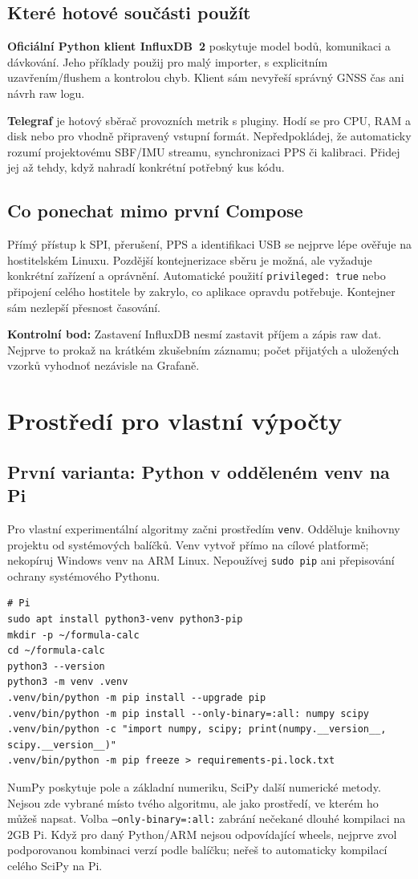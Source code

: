 \documentclass[11pt,a4paper]{article}
\newcommand{\kontrola}[1]{\par\noindent\textbf{Kontrolní bod:} #1\par}
\begin{document}
\subsection{Které hotové součásti použít}
\textbf{Oficiální Python klient InfluxDB~2} poskytuje model bodů, komunikaci a dávkování. Jeho příklady použij pro malý importer, s explicitním uzavřením/flushem a kontrolou chyb. Klient sám nevyřeší správný GNSS čas ani návrh raw logu.\cite{python-client}

\textbf{Telegraf} je hotový sběrač provozních metrik s pluginy. Hodí se pro CPU, RAM a disk nebo pro vhodně připravený vstupní formát. Nepředpokládej, že automaticky rozumí projektovému SBF/IMU streamu, synchronizaci PPS či kalibraci. Přidej jej až tehdy, když nahradí konkrétní potřebný kus kódu.\cite{telegraf}

\subsection{Co ponechat mimo první Compose}
Přímý přístup k SPI, přerušení, PPS a identifikaci USB se nejprve lépe ověřuje na hostitelském Linuxu. Pozdější kontejnerizace sběru je možná, ale vyžaduje konkrétní zařízení a oprávnění. Automatické použití \texttt{privileged: true} nebo připojení celého hostitele by zakrylo, co aplikace opravdu potřebuje. Kontejner sám nezlepší přesnost časování.

\kontrola{Zastavení InfluxDB nesmí zastavit příjem a zápis raw dat. Nejprve to prokaž na krátkém zkušebním záznamu; počet přijatých a uložených vzorků vyhodnoť nezávisle na Grafaně.}

\clearpage
\section{Prostředí pro vlastní výpočty}
\subsection{První varianta: Python v odděleném venv na Pi}
Pro vlastní experimentální algoritmy začni prostředím \texttt{venv}. Odděluje knihovny projektu od systémových balíčků. Venv vytvoř přímo na cílové platformě; nekopíruj Windows venv na ARM Linux. Nepoužívej \texttt{sudo pip} ani přepisování ochrany systémového Pythonu.\cite{venv}

\begin{lstlisting}
# Pi
sudo apt install python3-venv python3-pip
mkdir -p ~/formula-calc
cd ~/formula-calc
python3 --version
python3 -m venv .venv
.venv/bin/python -m pip install --upgrade pip
.venv/bin/python -m pip install --only-binary=:all: numpy scipy
.venv/bin/python -c "import numpy, scipy; print(numpy.__version__, scipy.__version__)"
.venv/bin/python -m pip freeze > requirements-pi.lock.txt
\end{lstlisting}
NumPy poskytuje pole a základní numeriku, SciPy další numerické metody. Nejsou zde vybrané místo tvého algoritmu, ale jako prostředí, ve kterém ho můžeš napsat. Volba \texttt{--only-binary=:all:} zabrání nečekané dlouhé kompilaci na 2GB Pi. Když pro daný Python/ARM nejsou odpovídající wheels, nejprve zvol podporovanou kombinaci verzí podle balíčku; neřeš to automaticky kompilací celého SciPy na Pi.\cite{numpy,scipy}
\end{document}

